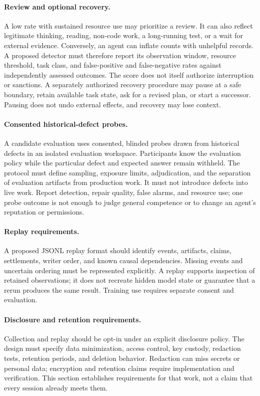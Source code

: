 \documentclass[11pt,a4paper]{article}
\theoremstyle{definition}
\theoremstyle{remark}
\begin{document}
\paragraph{Review and optional recovery.}
A low rate with sustained resource use may prioritize a review. It can also
reflect legitimate thinking, reading, non-code work, a long-running test, or a
wait for external evidence. Conversely, an agent can inflate counts with
unhelpful records. A proposed detector must therefore report its observation
window, resource threshold, task class, and false-positive and false-negative
rates against independently assessed outcomes. The score does not itself
authorize interruption or sanctions. A separately authorized recovery procedure
may pause at a safe boundary, retain available task state, ask for a revised
plan, or start a successor. Pausing does not undo external effects, and
recovery may lose context.

\paragraph{Consented historical-defect probes.}
A candidate evaluation uses consented, blinded probes drawn from historical
defects in an isolated evaluation workspace. Participants know the evaluation
policy while the particular defect and expected answer remain withheld. The
protocol must define sampling, exposure limits, adjudication, and the separation
of evaluation artifacts from production work. It must not introduce defects into
live work. Report detection, repair quality, false alarms, and resource use;
one probe outcome is not enough to judge general competence or to change an
agent's reputation or permissions.

\paragraph{Replay requirements.}
A proposed JSONL replay format should identify events, artifacts, claims,
settlements, writer order, and known causal dependencies. Missing events and
uncertain ordering must be represented explicitly. A replay supports inspection
of retained observations; it does not recreate hidden model state or guarantee
that a rerun produces the same result. Training use requires separate consent
and evaluation.

\paragraph{Disclosure and retention requirements.}
Collection and replay should be opt-in under an explicit disclosure policy.
The design must specify data minimization, access control, key custody,
redaction tests, retention periods, and deletion behavior. Redaction can miss
secrets or personal data; encryption and retention claims require implementation
and verification. This section establishes requirements for that work, not a
claim that every session already meets them.
\end{document}
